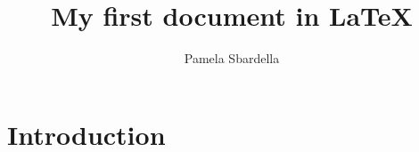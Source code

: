 











\usepackage[utf8]{inputenc}

\usepackage{graphicx} %

\usepackage{color}

\title{My first document in LaTeX}

\author{Pamela Sbardella}

\date{}



\maketitle


\section{Introduction}


